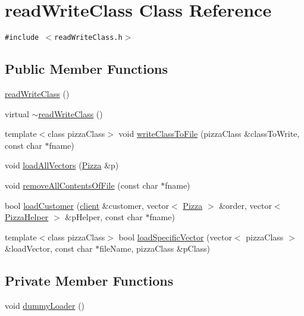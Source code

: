 \hypertarget{classread_write_class}{
\section{read\-Write\-Class Class Reference}
\label{classread_write_class}
}
{\tt \#include $<$read\-Write\-Class.h$>$}

\subsection*{Public Member Functions}
\begin{CompactItemize}
\item 
\hyperlink{classread_write_class_6db1c799fac571a924d5f276094c2b5c}{read\-Write\-Class} ()
\item 
virtual \hyperlink{classread_write_class_17d5dddd8a25946f62055c4d78fb22d8}{$\sim$read\-Write\-Class} ()
\item 
template$<$class pizza\-Class$>$ void \hyperlink{classread_write_class_abb1ed8e2de573d0548c582c8df29de1}{write\-Class\-To\-File} (pizza\-Class \&class\-To\-Write, const char $\ast$fname)
\item 
void \hyperlink{classread_write_class_7a6da2d64d652963e15693695f38b019}{load\-All\-Vectors} (\hyperlink{class_pizza}{Pizza} \&p)
\item 
void \hyperlink{classread_write_class_40de8d6c8e60d97ea037a48a0096fcfb}{remove\-All\-Contents\-Of\-File} (const char $\ast$fname)
\item 
bool \hyperlink{classread_write_class_b078183ae301dfe3e5197f25677d3abc}{load\-Customer} (\hyperlink{classclient}{client} \&customer, vector$<$ \hyperlink{class_pizza}{Pizza} $>$ \&order, vector$<$ \hyperlink{class_pizza_helper}{Pizza\-Helper} $>$ \&p\-Helper, const char $\ast$fname)
\item 
template$<$class pizza\-Class$>$ bool \hyperlink{classread_write_class_c853fce40cfb6790d054df75b933889f}{load\-Specific\-Vector} (vector$<$ pizza\-Class $>$ \&load\-Vector, const char $\ast$file\-Name, pizza\-Class \&p\-Class)
\end{CompactItemize}
\subsection*{Private Member Functions}
\begin{CompactItemize}
\item 
void \hyperlink{classread_write_class_a73e0ba1f66bb2de1f0f36586b54afc7}{dummy\-Loader} ()
\end{CompactItemize}


